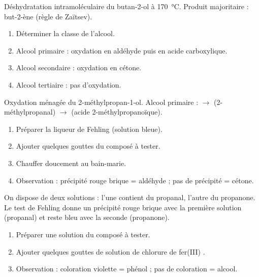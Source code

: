 \begin{exemple}
Déshydratation intramoléculaire du butan-2-ol à \SI{170}{\celsius}.
Produit majoritaire : but-2-ène (règle de Zaïtsev).
\end{exemple}

\begin{enumerate}
\item Déterminer la classe de l'alcool.
\item Alcool primaire : oxydation en aldéhyde puis en acide carboxylique.
\item Alcool secondaire : oxydation en cétone.
\item Alcool tertiaire : pas d'oxydation.
\end{enumerate}

\begin{exemple}
Oxydation ménagée du 2-méthylpropan-1-ol.
Alcool primaire :  $\rightarrow$  (2-méthylpropanal) $\rightarrow$  (acide 2-méthylpropanoïque).
\end{exemple}

\begin{enumerate}
\item Préparer la liqueur de Fehling (solution bleue).
\item Ajouter quelques gouttes du composé à tester.
\item Chauffer doucement au bain-marie.
\item Observation : précipité rouge brique = aldéhyde ; pas de précipité = cétone.
\end{enumerate}

\begin{exemple}
On dispose de deux solutions : l'une contient du propanal, l'autre du propanone. Le test de Fehling donne un précipité rouge brique avec la première solution (propanal) et reste bleu avec la seconde (propanone).
\end{exemple}

\begin{enumerate}
\item Préparer une solution du composé à tester.
\item Ajouter quelques gouttes de solution de chlorure de fer(III) .
\item Observation : coloration violette = phénol ; pas de coloration = alcool.
\end{enumerate}

